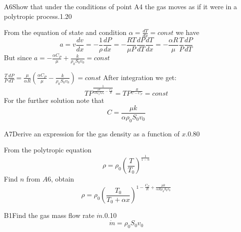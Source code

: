 \documentclass[11pt,a4paper]{article}
\begin{document}
\begin{solcard}{A6}{Show that under the conditions of point A4 the gas moves as if it were in a polytropic process.}{1.20}

From the equation of state and condition $\alpha=\frac{dT}{dx}=const$ we have$$
a=v\frac{dv}{dx}=-\frac{1}{\rho}\frac{dP}{dx}=-\frac{RT}{\mu P}\frac{dP}{dT}\frac{dT}{dx}=-\frac{\alpha R}{\mu}\frac{T}{P}\frac{dP}{dT}

 $$ But since $a=-\frac{\alpha C_P}{\mu}+\frac{k}{\rho_0S_0v_0}=const$ 

 $\frac{T}{P}\frac{dP}{dT}=\frac{\mu}{\alpha R}\left(\frac{\alpha C_P}{\mu}-\frac{k}{\rho_0S_0v_0}\right)=const$ After integration we get:$$
TP^{\frac{1}{\frac{\mu k}{\alpha R\rho_0S_0v_0}-\frac{C_P}{R}}}=TP^\frac{R}{C -C_P}=const

 $$ For the further solution note that$$
C=\frac{\mu k}{\alpha \rho_0S_0v_0}$$

\end{solcard}

\begin{solcard}{A7}{Derive an expression for the gas density as a function of $x$.}{0.80}

From the polytropic equation$$
\rho=\rho_0\left(\frac{T}{T_0}\right)^\frac{1}{1-n}

 $$ Find $n$  from $A6$, obtain$$
\rho=\rho_0\left(\frac{T_0}{T_0+\alpha x}\right)^{1-\frac{C_P}{R}+\frac{\mu k}{\alpha R\rho_0S_0v_0}}$$

\end{solcard}

\begin{solcard}{B1}{Find the gas mass flow rate $\dot{m}$.}{0.10}$$
\dot{m}=\rho_0S_0v_0$$

\end{solcard}

\end{document}
